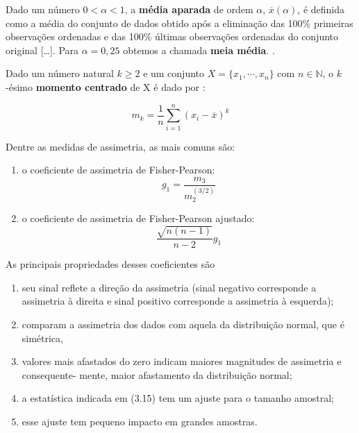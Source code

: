 \documentclass[
]{latex/krantz}
\providecommand{\tightlist}{%
  \setlength{\itemsep}{0pt}\setlength{\parskip}{0pt}}
\renewenvironment{quote}{\begin{VF}}{\end{VF}}
\theoremstyle{definition}
\theoremstyle{definition}
\theoremstyle{definition}
\theoremstyle{definition}
\theoremstyle{remark}
\begin{document}
\begin{quote}
Dado um número \(0 < \alpha < 1\), a \textbf{média aparada} de ordem \(\alpha\), \(\overline{x}(\alpha)\), é definida como a média do conjunto de dados obtido após a eliminação das 100\% primeiras observações ordenadas e das 100\% últimas observações ordenadas do conjunto original {[}\ldots{]}. Para \(\alpha = 0,25\) obtemos a chamada \textbf{meia média}. \citep[p.~47]{MorettinSinger2022}.
\end{quote}

Dado um número natural \(k \geq 2\) e um conjunto \(X = \{x_{1}, \cdots, x_{n}\}\) com \(n \in \mathbb{N}\), o \(k\)-ésimo \textbf{momento centrado} de X é dado por \citep[p.~50]{MorettinSinger2022}:

\[m_{k} = \frac{1}{n}\sum_{i = 1}^{n}(x_{i} - \overline{x})^{k}\]

\begin{quote}
Dentre as medidas de assimetria, as mais comuns são:

\begin{enumerate}
\def\labelenumi{\alph{enumi})}
\tightlist
\item
  o coeficiente de assimetria de Fisher-Pearson: \[g_{1} = \frac{m_{3}}{m_{2}^{(3/2)}}\]
\item
  o coeficiente de assimetria de Fisher-Pearson ajustado: \[\frac{\sqrt{n (n - 1)}}{n - 2} g_{1}\]
  \citep[p.~50]{MorettinSinger2022}
\end{enumerate}
\end{quote}

\begin{quote}
As principais propriedades desses coeficientes são

\begin{enumerate}
\def\labelenumi{\roman{enumi})}
\tightlist
\item
  seu sinal reflete a direção da assimetria (sinal negativo corresponde a assimetria à direita e sinal positivo corresponde a assimetria à esquerda);
\item
  comparam a assimetria dos dados com aquela da distribuição normal, que é simétrica,
\item
  valores mais afastados do zero indicam maiores magnitudes de assimetria e consequente- mente, maior afastamento da distribuição normal;
\item
  a estatística indicada em (3.15) tem um ajuste para o tamanho amostral;
\item
  esse ajuste tem pequeno impacto em grandes amostras.
  \citep[p.~51]{MorettinSinger2022}
\end{enumerate}
\end{quote}
\end{document}
